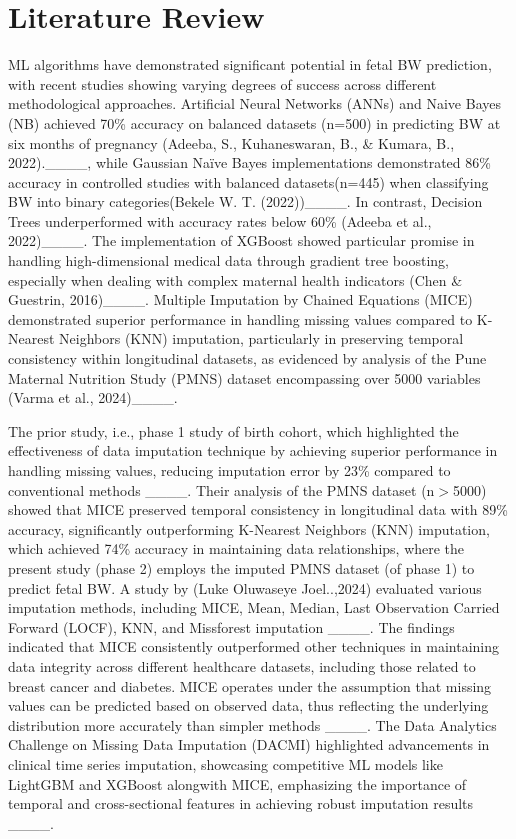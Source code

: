\section{Literature Review}
ML algorithms have demonstrated significant potential in fetal BW prediction, with recent studies showing varying degrees of success across different methodological approaches. Artificial Neural Networks (ANNs) and Naive Bayes (NB) achieved 70\% accuracy on balanced datasets (n=500) in predicting BW at six months of pregnancy (Adeeba, S., Kuhaneswaran, B., \& Kumara, B., 2022).____, while Gaussian Naïve Bayes implementations demonstrated 86\% accuracy in controlled studies with balanced datasets(n=445) when classifying BW into binary categories(Bekele W. T. (2022))____. In contrast, Decision Trees underperformed with accuracy rates below 60\% (Adeeba et al., 2022)____. The implementation of XGBoost showed particular promise in handling high-dimensional medical data through gradient tree boosting, especially when dealing with complex maternal health indicators (Chen \& Guestrin, 2016)____. Multiple Imputation by Chained Equations (MICE) demonstrated superior performance in handling missing values compared to K-Nearest Neighbors (KNN) imputation, particularly in preserving temporal consistency within longitudinal datasets, as evidenced by analysis of the Pune Maternal Nutrition Study (PMNS) dataset encompassing over 5000 variables (Varma et al., 2024)____.
 
The prior study, i.e., phase 1 study of birth cohort, which highlighted the effectiveness of data imputation technique by achieving superior performance in handling missing values, reducing imputation error by 23\% compared to conventional methods ____. Their analysis of the PMNS dataset (n$>$5000) showed that MICE preserved temporal consistency in longitudinal data with 89\% accuracy, significantly outperforming K-Nearest Neighbors (KNN) imputation, which achieved 74\% accuracy in maintaining data relationships, where the present study (phase 2) employs the imputed PMNS dataset (of phase 1) to predict fetal BW. A study by (Luke Oluwaseye Joel..,2024) evaluated various imputation methods, including MICE, Mean, Median, Last Observation Carried Forward (LOCF), KNN, and Missforest imputation ____. The findings indicated that MICE consistently outperformed other techniques in maintaining data integrity across different healthcare datasets, including those related to breast cancer and diabetes.  MICE operates under the assumption that missing values can be predicted based on observed data, thus reflecting the underlying distribution more accurately than simpler methods ____. The Data Analytics Challenge on Missing Data Imputation (DACMI) highlighted advancements in clinical time series imputation, showcasing competitive ML models like LightGBM and XGBoost alongwith MICE, emphasizing the importance of temporal and cross-sectional features in achieving robust imputation results ____.

